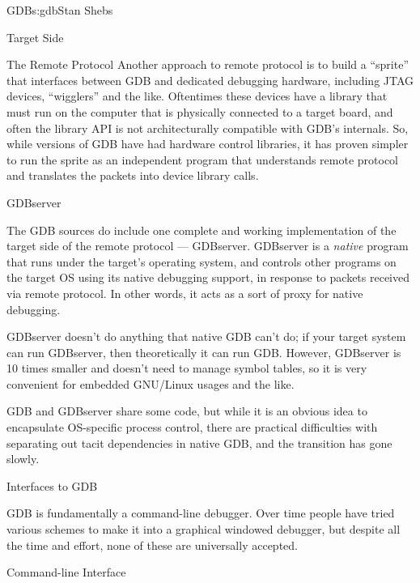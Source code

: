 \begin{aosachapter}{GDB}{s:gdb}{Stan Shebs}
\begin{aosasect1}{Target Side}
\begin{aosasect2}{The Remote Protocol}
Another approach to remote protocol is to build a ``sprite'' that
interfaces between GDB and dedicated debugging hardware, including
JTAG devices, ``wigglers'' and the like.  Oftentimes these devices
have a library that must run on the computer that is physically
connected to a target board, and often the library API is not
architecturally compatible with GDB's internals.  So, while versions of
GDB have had hardware control libraries, it has proven simpler to run
the sprite as an independent program that understands remote protocol
and translates the packets into device library calls.

\end{aosasect2}

\begin{aosasect2}{GDBserver}

The GDB sources do include one complete and working implementation of
the target side of the remote protocol --- GDBserver.  GDBserver is a
{\em native} program that runs under the target's operating system,
and controls other programs on the target OS using its native
debugging support, in response to packets received via remote protocol.
In other words, it acts as a sort of proxy for native debugging.

GDBserver doesn't do anything that native GDB can't do; if your target
system can run GDBserver, then theoretically it can run GDB.  However,
GDBserver is 10 times smaller and doesn't need to manage symbol
tables, so it is very convenient for embedded GNU/Linux usages and the
like.


GDB and GDBserver share some code, but while it is an obvious idea to
encapsulate OS-specific process control, there are practical difficulties
with separating out tacit dependencies in native GDB, and the transition
has gone slowly.

\end{aosasect2}

\end{aosasect1}

\begin{aosasect1}{Interfaces to GDB}

GDB is fundamentally a command-line debugger.  Over time people have
tried various schemes to make it into a graphical windowed debugger,
but despite all the time and effort, none of these are universally
accepted.

\begin{aosasect2}{Command-line Interface}


\end{aosasect2}
\end{aosasect1}
\end{aosachapter}
